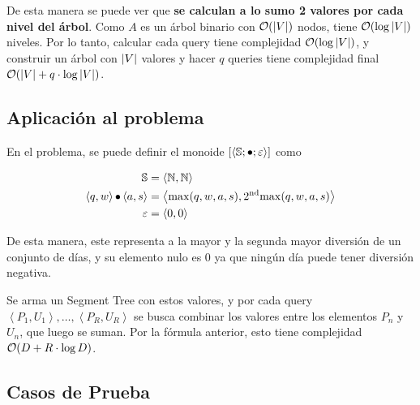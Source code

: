 De esta manera se puede ver que \textbf{se calculan a lo sumo 2 valores por cada nivel del árbol}. Como \(A\) es un árbol binario con \(\mathcal{O}(\left|V\right|)\) nodos, tiene \(\mathcal{O}(\log \left|V\right|)\) niveles. Por lo tanto, calcular cada query tiene complejidad \(\mathcal{O}(\log \left|V\right|)\), y construir un árbol con \(\left|V\right|\) valores y hacer \(q\) queries tiene complejidad final \(\mathcal{O}(\left|V\right| + q \cdot \log \left|V\right|)\).

\subsection{Aplicación al problema}

En el problema, se puede definir el monoide \(\left[\left<\mathbb{S}; \operatorname{\bullet}; \mathbf{\varepsilon}\right>\right]\) como

\[
\begin{split}
	\mathbb{S} &= \left<\mathbb{N}, \mathbb{N}\right> \\
	\left<q, w\right> \operatorname{\bullet} \left<a, s\right> &= \left<\operatorname{max}(q, w, a, s), \operatorname{2^{nd}max}(q, w, a, s)\right> \\
	\mathbf{\varepsilon} &= \left<0, 0\right>
\end{split}
\]

De esta manera, este representa a la mayor y la segunda mayor diversión de un conjunto de días, y su elemento nulo es 0 ya que ningún día puede tener diversión negativa.

Se arma un Segment Tree con estos valores, y por cada query \(\left<P_1, U_1\right>, \dots, \left<P_R, U_R\right>\) se busca combinar los valores entre los elementos \(P_n\) y \(U_n\), que luego se suman. Por la fórmula anterior, esto tiene complejidad \(\mathcal{O}(D + R \cdot \log D)\).

\subsection{Casos de Prueba}

